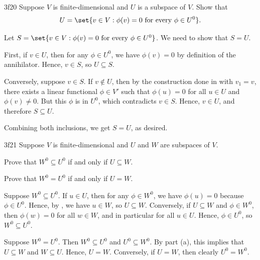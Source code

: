 \begin{exercise}{3f20}
    Suppose $V$ is finite-dimensional and $U$ is a subspace of $V$.
	Show that
    \[
    	U = \set{v \in V : \phi(v) = 0 \text{ for every } \phi \in U^0}.
    \]
\end{exercise}

\begin{sol}
    Let $S = \set{v \in V : \phi(v) = 0 \text{ for every } \phi \in U^0}$.
	We need to show that $S = U$.

    First, if $v \in U$, then for any $\phi \in U^0$, we have $\phi(v) = 0$ by definition of the annihilator.
	Hence, $v \in S$, so $U \subseteq S$.

    Conversely, suppose $v \in S$.
	If $v \notin U$, then by the construction done in  with $v_1 = v$, there exists a linear functional $\phi \in V'$ such that $\phi(u) = 0$ for all $u \in U$ and $\phi(v) \neq 0$.
	But this $\phi$ is in $U^0$, which contradicts $v \in S$.
	Hence, $v \in U$, and therefore $S \subseteq U$.

    Combining both inclusions, we get $S = U$, as desired.
\end{sol}

\begin{exercise}{3f21}
    Suppose $V$ is finite-dimensional and $U$ and $W$ are subspaces of $V$.
    \begin{subexercises}
        \item Prove that $W^0 \subseteq U^0$ if and only if $U \subseteq W$.
        \item Prove that $W^0 = U^0$ if and only if $U = W$.
    \end{subexercises}
\end{exercise}

\begin{solenum}
    \item Suppose $W^0 \subseteq U^0$.
	If $u \in U$, then for any $\phi \in W^0$, we have $\phi(u) = 0$ because $\phi \in U^0$.
	Hence, by , we have $u \in W$, so $U \subseteq W$.
	Conversely, if $U \subseteq W$ and $\phi \in W^0$, then $\phi(w) = 0$ for all $w \in W$, and in particular for all $u \in U$.
	Hence, $\phi \in U^0$, so $W^0 \subseteq U^0$.
    \item Suppose $W^0 = U^0$.
	Then $W^0 \subseteq U^0$ and $U^0 \subseteq W^0$.
	By part (a), this implies that $U \subseteq W$ and $W \subseteq U$.
	Hence, $U = W$.
	Conversely, if $U = W$, then clearly $U^0 = W^0$.
\end{solenum}

